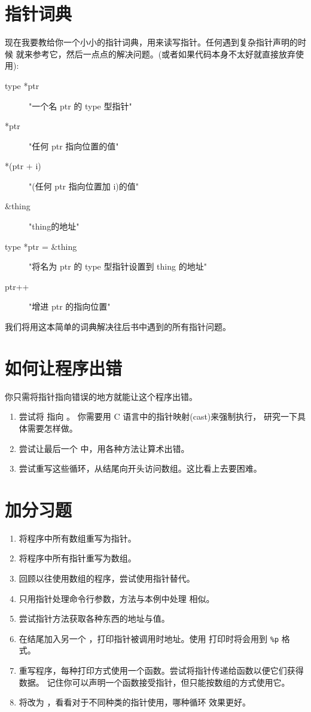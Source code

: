 \section{指针词典}

现在我要教给你一个小小的指针词典，用来读写指针。任何遇到复杂指针声明的时候
就来参考它，然后一点点的解决问题。(或者如果代码本身不太好就直接放弃使用):

\begin{description}
\item[type *ptr] "一个名 ptr 的 type 型指针"
\item[*ptr] "任何 ptr 指向位置的值"
\item[*(ptr + i)] "(任何 ptr 指向位置加 i)的值"
\item[\&thing] "thing的地址"
\item[type *ptr = \&thing] "将名为 ptr 的 type 型指针设置到 thing 的地址"
\item[ptr++] "增进 ptr 的指向位置"
\end{description}

我们将用这本简单的词典解决往后书中遇到的所有指针问题。

\section{如何让程序出错}

你只需将指针指向错误的地方就能让这个程序出错。

\begin{enumerate}
\item 尝试将  指向 。 你需要用 C 语言中的指针映射(cast)来强制执行，
	研究一下具体需要怎样做。
\item 尝试让最后一个 中，用各种方法让算术出错。
\item 尝试重写这些循环，从结尾向开头访问数组。这比看上去要困难。
\end{enumerate}

\section{加分习题}

\begin{enumerate}
\item 将程序中所有数组重写为指针。
\item 将程序中所有指针重写为数组。
\item 回顾以往使用数组的程序，尝试使用指针替代。
\item 只用指针处理命令行参数，方法与本例中处理  相似。
\item 尝试指针方法获取各种东西的地址与值。
\item 在结尾加入另一个 ，打印指针被调用时地址。使用 
	打印时将会用到 \verb|%p| 格式。
\item 重写程序，每种打印方式使用一个函数。尝试将指针传递给函数以便它们获得数据。
	记住你可以声明一个函数接受指针，但只能按数组的方式使用它。
\item 将改为 ，看看对于不同种类的指针使用，哪种循环
	效果更好。
\end{enumerate}


